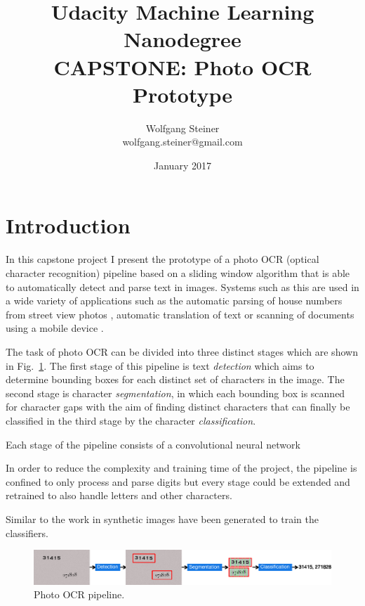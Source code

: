 \documentclass[11pt]{article}
\title{Udacity Machine Learning Nanodegree\\ CAPSTONE: Photo OCR Prototype}
\author{Wolfgang Steiner \\ \small{wolfgang.steiner@gmail.com}}
\date{January 2017}
\begin{document}
\maketitle
\section{Introduction}
In this capstone project I present the prototype of a photo OCR (optical character recognition)
pipeline based on a sliding window algorithm that is able to automatically detect and parse
text in images. Systems such as this are used in a wide variety of applications
such as the automatic parsing of house numbers from street view photos \cite{Goodfellow2013},
automatic translation of text \cite{} or scanning of documents using a mobile device \cite{}.

The task of photo OCR can be divided into three distinct stages which are shown in Fig.~\ref{fig:pipeline}.
The first stage of this pipeline is text \emph{detection} which aims to determine bounding boxes for each
distinct set of characters in the image. The second stage is character \emph{segmentation}, in which
each bounding box is scanned for character gaps with the aim of finding distinct characters
that can finally be classified in the third stage by the character \emph{classification}.

Each stage of the pipeline consists of a convolutional neural network

In order to reduce the complexity and training time of the project, the pipeline is confined to
only process and parse digits but every stage could be extended and retrained to also handle letters
and other characters.

Similar to the work in \cite{Jaderberg2016} synthetic images have been generated to train the classifiers.


\begin{figure}[ht]
    \centering
    \includegraphics[scale=0.8]{fig/Pipeline}
    \caption{Photo OCR pipeline.}
    \label{fig:pipeline}
\end{figure}
\end{document}

